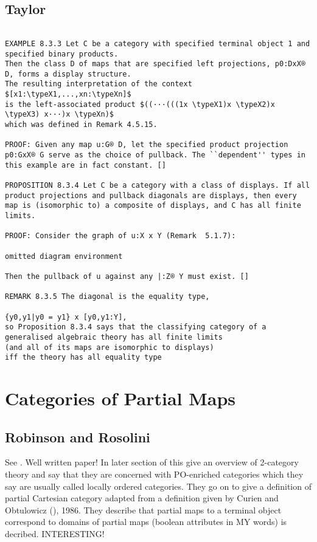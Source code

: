 \documentclass[14pt,a4paper]{scrartcl}
\begin{document}
\subsection{Taylor}
\begin{verbatim}

EXAMPLE 8.3.3 Let C be a category with specified terminal object 1 and specified binary products. 
Then the class D of maps that are specified left projections, p0:DxX® D, forms a display structure. 
The resulting interpretation of the context $[x1:\typeX1,...,xn:\typeXn]$
is the left-associated product $((···(((1x \typeX1)x \typeX2)x \typeX3) x···)x \typeXn)$
which was defined in Remark 4.5.15.

PROOF: Given any map u:G® D, let the specified product projection p0:GxX® G serve as the choice of pullback. The ``dependent'' types in this example are in fact constant. []

PROPOSITION 8.3.4 Let C be a category with a class of displays. If all product projections and pullback diagonals are displays, then every map is (isomorphic to) a composite of displays, and C has all finite limits.

PROOF: Consider the graph of u:X x Y (Remark  5.1.7):

omitted diagram environment

Then the pullback of u against any |:Z® Y must exist. []

REMARK 8.3.5 The diagonal is the equality type,

{y0,y1|y0 = y1} x [y0,y1:Y],
so Proposition 8.3.4 says that the classifying category of a 
generalised algebraic theory has all finite limits 
(and all of its maps are isomorphic to displays) 
iff the theory has all equality type
\end{verbatim}

\section{Categories of Partial Maps}
\subsection{Robinson and Rosolini}
See \cite{robinson1988}.
Well written paper!
In later section of this give an overview of 2-category theory and say that they are concerned with 
PO-enriched categories which they say are usually called locally ordered categories.
They go on to give a definition of partial Cartesian category  adapted from a definition given by Curien and Obtulowicz
(\cite{curien1986}),
1986. They describe that partial maps to a terminal object correspond to domains of partial maps (boolean attributes in MY words) is decribed. INTERESTING!
\end{document}
